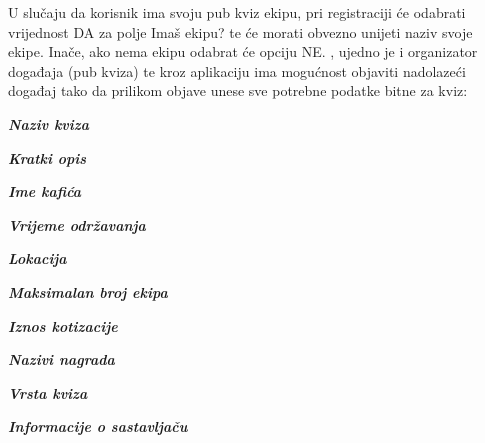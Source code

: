 		U slučaju da korisnik ima svoju pub kviz ekipu, pri registraciji će odabrati vrijednost DA za polje Imaš ekipu? te će morati obvezno unijeti naziv svoje ekipe. Inače, ako nema ekipu odabrat će opciju NE.
		\newline \newline
		, ujedno je i organizator događaja (pub kviza) te kroz aplikaciju ima mogućnost objaviti nadolazeći događaj tako da prilikom objave unese sve potrebne podatke bitne za kviz:
		\begin{packed_item}
			\item \textit{\textbf{Naziv kviza}}
			\item \textit{\textbf{Kratki opis}}
			\item \textit{\textbf{Ime kafića}}
			\item \textit{\textbf{Vrijeme održavanja}}
			\item \textit{\textbf{Lokacija}}
			\item \textit{\textbf{Maksimalan broj ekipa}}
			\item \textit{\textbf{Iznos kotizacije}}
			\item \textit{\textbf{Nazivi nagrada}}
			\item \textit{\textbf{Vrsta kviza}}
			\item \textit{\textbf{Informacije o sastavljaču}}
			
		\end{packed_item}
	
